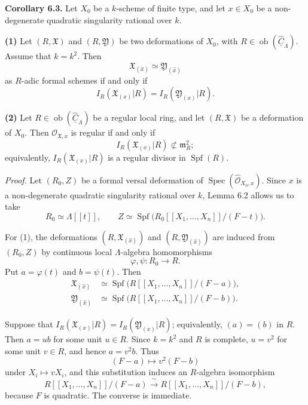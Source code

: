 \par\medskip
\noindent\textbf{Corollary 6.3.}
Let $X_0$ be a $k$-scheme of finite type, and let $x\in X_0$ be a
non-degenerate quadratic singularity rational over $k$.

\smallskip
\noindent\textbf{(1)} Let $(R,\mathfrak X)$ and
$(R,\mathfrak Y)$ be two deformations of $X_0$, with
$R\in\operatorname{ob}(\widehat{\underline C}_\Lambda)$. Assume that
$k=k^2$. Then
\[
\mathfrak X_{(\widehat x)}\simeq
\mathfrak Y_{(\widehat x)}
\]
as $R$-adic formal schemes if and only if
\[
I_R(\mathfrak X_{(x)}|R)=I_R(\mathfrak Y_{(x)}|R).
\]

\smallskip
\noindent\textbf{(2)} Let
$R\in\operatorname{ob}(\widehat{\underline C}_\Lambda)$ be a regular
local ring, and let $(R,\mathfrak X)$ be a deformation of $X_0$.
Then $\mathcal O_{\mathfrak X,x}$ is regular if and only if
\[
I_R(\mathfrak X_{(x)}|R)\not\subset\mathfrak m_R^2;
\]
equivalently, $I_R(\mathfrak X_{(x)}|R)$ is a regular divisor in
$\operatorname{Spf}(R)$.

\smallskip
\noindent\textit{Proof.}
Let $(R_0,Z)$ be a formal versal deformation of
$\operatorname{Spec}(\widehat{\mathcal O}_{X_0,x})$. Since $x$ is a
non-degenerate quadratic singularity rational over $k$, Lemma 6.2
allows us to take
\[
R_0\simeq\Lambda[[t]],
\qquad
Z\simeq\operatorname{Spf}
 \bigl(R_0[[X_1,\ldots,X_n]]/(F-t)\bigr).
\]

For (1), the deformations
$(R,\mathfrak X_{(\widehat x)})$ and
$(R,\mathfrak Y_{(\widehat x)})$ are induced from $(R_0,Z)$ by
continuous local $\Lambda$-algebra homomorphisms
\[
\varphi,\psi:R_0\longrightarrow R.
\]
Put $a=\varphi(t)$ and $b=\psi(t)$. Then
\[
\begin{aligned}
\mathfrak X_{(\widehat x)}
&\simeq\operatorname{Spf}
 \bigl(R[[X_1,\ldots,X_n]]/(F-a)\bigr),\\
\mathfrak Y_{(\widehat x)}
&\simeq\operatorname{Spf}
 \bigl(R[[X_1,\ldots,X_n]]/(F-b)\bigr).
\end{aligned}
\]


Suppose that
$I_R(\mathfrak X_{(x)}|R)=I_R(\mathfrak Y_{(x)}|R)$; equivalently,
$(a)=(b)$ in $R$. Then $a=ub$ for some unit $u\in R$. Since
$k=k^2$ and $R$ is complete, $u=v^2$ for some unit $v\in R$, and
hence $a=v^2b$. Thus
\[
(F-a)\longmapsto v^2(F-b)
\]
under $X_i\mapsto vX_i$, and this substitution induces an
$R$-algebra isomorphism
\[
R[[X_1,\ldots,X_n]]/(F-a)
 \xrightarrow{\ \sim\ }
R[[X_1,\ldots,X_n]]/(F-b),
\]
because $F$ is quadratic. The converse is immediate.

